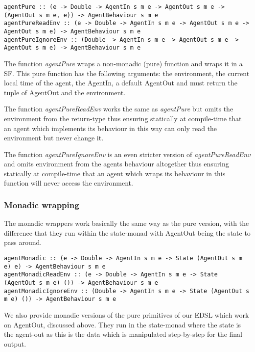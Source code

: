 \begin{verbatim}
agentPure :: (e -> Double -> AgentIn s m e -> AgentOut s m e -> (AgentOut s m e, e)) -> AgentBehaviour s m e
agentPureReadEnv :: (e -> Double -> AgentIn s m e -> AgentOut s m e -> AgentOut s m e) -> AgentBehaviour s m e
agentPureIgnoreEnv :: (Double -> AgentIn s m e -> AgentOut s m e -> AgentOut s m e) -> AgentBehaviour s m e
\end{verbatim}

The function \textit{agentPure} wraps a non-monadic (pure) function and wraps it in a SF. This pure function has the following arguments: the environment, the current local time of the agent, the AgentIn, a default AgentOut and must return the tuple of AgentOut and the environment.

The function \textit{agentPureReadEnv} works the same as \textit{agentPure} but omits the environment from the return-type thus ensuring statically at compile-time that an agent which implements its behaviour in this way can only read the environment but never change it.

The function \textit{agentPureIgnoreEnv} is an even stricter version of \textit{agentPureReadEnv} and omits environment from the agents behaviour altogether thus ensuring statically at compile-time  that an agent which wraps its behaviour in this function will never access the environment.

\subsubsection{Monadic wrapping}
The monadic wrappers work basically the same way as the pure version, with the difference that they run within the state-monad with AgentOut being the state to pass around.

\begin{verbatim}
agentMonadic :: (e -> Double -> AgentIn s m e -> State (AgentOut s m e) e) -> AgentBehaviour s m e
agentMonadicReadEnv :: (e -> Double -> AgentIn s m e -> State (AgentOut s m e) ()) -> AgentBehaviour s m e
agentMonadicIgnoreEnv :: (Double -> AgentIn s m e -> State (AgentOut s m e) ()) -> AgentBehaviour s m e
\end{verbatim}

We also provide monadic versions of the pure primitives of our EDSL which work on AgentOut, discussed above. They run in the state-monad where the state is the agent-out as this is the data which is manipulated step-by-step for the final output. 


